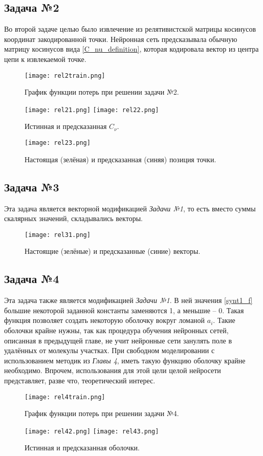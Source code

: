 \subsection{Задача №2}
Во второй задаче целью было извлечение из релятивистской матрицы косинусов координат закодированной точки. Нейронная сеть предсказывала обычную матрицу косинусов вида \ref{C_nu_definition}, которая кодировала вектор из центра цепи к извлекаемой точке.
\begin{figure}[H]
	\centering
	\texttt{[image: rel2train.png]}
	\caption{График функции потерь при решении задачи №2.}
	\label{fig_synt2_train}
\end{figure}
\begin{figure}[H]
	\centering
	\texttt{[image: rel21.png]}
	\texttt{[image: rel22.png]}
	\caption{Истинная и предсказанная $C_{\nu}$.}
	\label{fig_synt2_1}
\end{figure}
\begin{figure}[H]
	\centering
	\texttt{[image: rel23.png]}
	\caption{Настоящая (зелёная) и предсказанная (синяя) позиция точки.}
	\label{fig_synt2_2}
\end{figure}

\subsection{Задача №3}
Эта задача является векторной модификацией \textit{Задачи №1}, то есть вместо суммы скалярных значений, складывались векторы.
\begin{figure}[H]
	\centering
	\texttt{[image: rel31.png]}
	\caption{Настоящие (зелёные) и предсказанные (синие) векторы.}
	\label{fig_synt3}
\end{figure}

\subsection{Задача №4}
Эта задача также является модификацией \textit{Задачи №1}. В ней значения \ref{synt1_f} большие некоторой заданной константы заменяются 1, а меньшие -- 0. Такая функция позволяет создать некоторую оболочку вокруг ломаной $a_i$. Такие оболочки крайне нужны, так как процедура обучения нейронных сетей, описанная в предыдущей главе, не учит нейронные сети занулять поле в удалённых от молекулы участках. При свободном моделировании с использованием методик из \textit{Главы 4}, иметь такую функцию оболочку крайне необходимо. Впрочем, использования для этой цели целой нейросети представляет, разве что, теоретический интерес.
\begin{figure}[H]
	\centering
	\texttt{[image: rel4train.png]}
	\caption{График функции потерь при решении задачи №4.}
	\label{fig_synt3_train}
\end{figure}
\begin{figure}[H]
	\centering
	\texttt{[image: rel42.png]}
	\texttt{[image: rel43.png]}
	\caption{Истинная и предсказанная оболочки.}
	\label{fig_synt4}
\end{figure}

